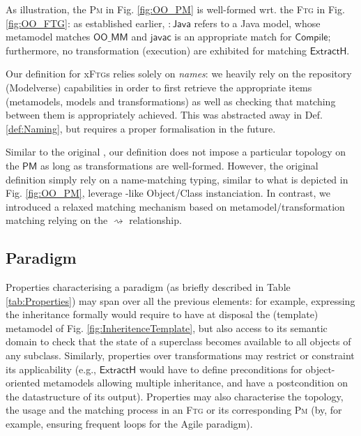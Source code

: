 As illustration, the \textsc{Pm} in Fig. \ref{fig:OO_PM} is well-formed wrt. 
the \textsc{Ftg} in Fig. \ref{fig:OO_FTG}: as established earlier, 
$\mathsf{:\!Java}$ refers to a Java model, whose metamodel matches 
$\mathsf{OO\_MM}$ and $\mathsf{javac}$ is an appropriate match for 
$\mathsf{Compile}$; furthermore, no transformation (execution) are exhibited for 
matching $\mathsf{ExtractH}$.

Our definition for x\textsc{Ftg}s relies solely on \emph{names}: we heavily 
rely on the repository (Modelverse) capabilities in order to first retrieve the 
appropriate items (metamodels, models and transformations) as well as checking 
that matching between them is appropriately achieved. This was abstracted away 
in Def. \ref{def:Naming}, but requires a proper formalisation in the future.

Similar to the original  
\cite{Mustafiz-etAl:2012,Lucio-Mustafiz-etAl:2013,TR:Lucio-Mustafiz-etAl:2012},
our definition does not impose a particular topology on the $\mathsf{PM}$ as 
long as transformations are well-formed. However, the original definition 
simply rely on a name-matching typing, similar to what is depicted in Fig. 
\ref{fig:OO_PM}, leverage \UML{}-like Object/Class instanciation. In contrast, 
we introduced a relaxed matching mechanism based on metamodel/transformation 
matching relying on the $\rightsquigarrow$ relationship.

\subsection{Paradigm}
\label{sec:PS}

Properties characterising a paradigm (as briefly described in Table 
\ref{tab:Properties}) may span over all the previous elements: for example, 
expressing the inheritance formally would require to have at disposal the 
(template) metamodel of Fig. \ref{fig:InheritenceTemplate}, but also access to 
its semantic domain to check that the state of a superclass becomes available 
to all objects of any subclass. Similarly, properties over transformations may 
restrict or constraint its applicability (e.g., $\mathsf{ExtractH}$ would have 
to define preconditions for object-oriented metamodels allowing multiple 
inheritance, and have a postcondition on the datastructure of its output). 
Properties may also characterise the topology, the usage and the matching 
process in an \textsc{Ftg} or its corresponding \textsc{Pm} (by, for example, 
ensuring frequent loops for the Agile paradigm). 

